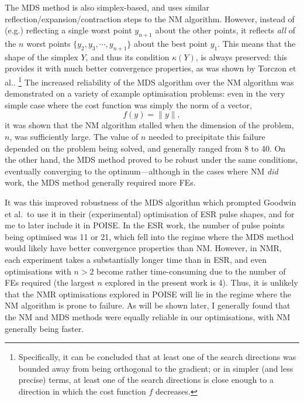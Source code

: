 The MDS method is also simplex-based, and uses similar reflection/expansion/contraction steps to the NM algorithm.
However, instead of (e.g.) reflecting a single worst point $y_{n+1}$ about the other points, it reflects \textit{all} of the $n$ worst points $\{y_2, y_3, \cdots, y_{n+1}\}$ about the best point $y_1$.
This means that the shape of the simplex $Y$, and thus its condition $\kappa(Y)$, is always preserved: this provides it with much better convergence properties, as was shown by Torczon et al.\autocite{Torczon1989,Torczon1991SIAMJO}.%
\footnote{Specifically, it can be concluded that at least one of the search directions was bounded away from being orthogonal to the gradient; or in simpler (and less precise) terms, at least one of the search directions is close enough to a direction in which the cost function $f$ decreases.}
The increased reliability of the MDS algorithm over the NM algorithm was demonstrated on a variety of example optimisation problems: even in the very simple case where the cost function was simply the norm of a vector,
\begin{equation}
    \label{eq:norm_cf}
    f(y) = \lVert y \rVert,
\end{equation}
it was shown that the NM algorithm stalled when the dimension of the problem, $n$, was sufficiently large.
The value of $n$ needed to precipitate this failure depended on the problem being solved, and generally ranged from 8 to 40.
On the other hand, the MDS method proved to be robust under the same conditions, eventually converging to the optimum---although in the cases where NM \textit{did} work, the MDS method generally required more FEs.

It was this improved robustness of the MDS algorithm which prompted Goodwin et al.\ to use it in their (experimental) optimisation of ESR pulse shapes\autocite{Goodwin2018JMR}, and for me to later include it in POISE.
In the ESR work, the number of pulse points being optimised was 11 or 21, which fell into the regime where the MDS method would likely have better convergence properties than NM.
However, in NMR, each experiment takes a substantially longer time than in ESR, and even optimisations with $n > 2$ become rather time-consuming due to the number of FEs required (the largest $n$ explored in the present work is 4).
Thus, it is unlikely that the NMR optimisations explored in POISE will lie in the regime where the NM algorithm is prone to failure.
As will be shown later, I generally found that the NM and MDS methods were equally reliable in our optimisations, with NM generally being faster.
